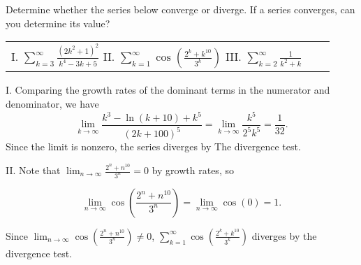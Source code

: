 \documentclass[noauthor]{ximera}
\begin{document}

\begin{problem}
Determine whether the series below converge or diverge.  If a series converges, can you determine its value?

\begin{center}
\begin{tabular}{lll}
I. $\sum_{k=3}^{\infty} \frac{(2k^2+1)^2}{k^4-3k+5}$ \qquad  \qquad II. $\sum_{k=1}^{\infty} \cos\left(\frac{2^k+k^{10}}{3^k}\right)$ \qquad \qquad  III. $\sum_{k=2}^{\infty} \frac{1}{k^2+k}$ 
\end{tabular}
\end{center}


\begin{freeResponse}
I. Comparing the growth rates of the dominant terms in the numerator and denominator, we have 
$$
\lim_{k \rightarrow \infty} \frac{k^3 - \ln(k+10) + k^5}{(2k+100)^5} = \lim_{k\rightarrow \infty} \frac{k^5}{2^5 k^5} = \frac{1}{32} .
$$
Since the limit is nonzero, the series diverges by The divergence test.

II. Note that $\lim_{n \to \infty} \frac{2^n+n^{10}}{3^n} =0$ by growth rates, so 

\[\lim_{n \to \infty} \cos\left(\frac{2^n+n^{10}}{3^n}\right) = \lim_{n \to \infty} \cos(0) =1. \]

Since $\lim_{n \to \infty} \cos\left(\frac{2^n+n^{10}}{3^n}\right) \neq 0$, $\sum_{k=1}^{\infty} \cos\left(\frac{2^k+k^{10}}{3^k}\right)$ diverges by the divergence test.

\end{freeResponse}

\end{problem}

\end{document}
